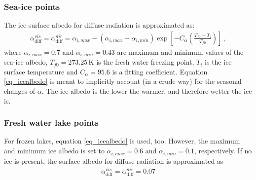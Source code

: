 \documentclass[a4paper,11pt]{article}
\begin{document}
\subsubsection{Sea-ice points}
The ice surface albedo for diffuse radiation is approximated as:
\begin{align}
  \alpha_{\mathrm{diff}}^{vis} = \alpha_{\mathrm{diff}}^{nir} = \alpha_{i,max} - 
  \left(\alpha_{i,max}-\alpha_{i,min}\right)\exp\left[-C_{\alpha}\left(\frac{T_{f0}-T_{i}}{T_{f0}}\right)\right]\,, \label{eq_icealbedo}
\end{align}
where $\alpha_{i,max}=0.7$ and $\alpha_{i,min}=0.43$ are maximum and minimum values of the sea-ice albedo, $T_{f0}=273.25\,\mathrm{K}$ is the fresh water freezing point, 
$T_{i}$ is the ice surface temperature and $C_{\alpha}=95.6$ is a fitting coefficient. Equation \ref{eq_icealbedo} is meant to implicitly account (in a crude way) for the seasonal 
changes of $\alpha$. The ice albedo is the lower the warmer, and therefore wetter the ice is.


\subsubsection{Fresh water lake points}
For frozen lakes, equation \ref{eq_icealbedo} is used, too. However, the maximum and minimum ice albedo is set to $\alpha_{i,max}=0.6$ and $\alpha_{i,min}=0.1$, respectively. 
If no ice is present, the surface albedo for diffuse radiation is approximated as
\begin{align}
   \alpha_{\mathrm{diff}}^{vis} = \alpha_{\mathrm{diff}}^{nir} =0.07
\end{align}
\end{document}
